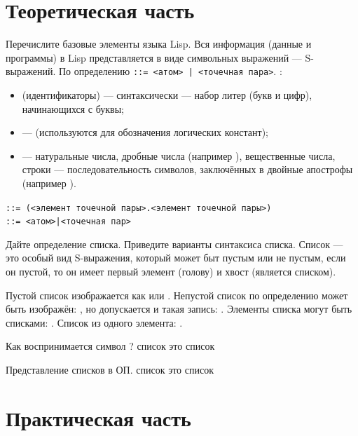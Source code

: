 \documentclass[a4paper]{report}
\begin{document}


\section*{Теоретическая часть}

\begin{qanda}
	\Q Перечислите базовые элементы языка Lisp.
	\A Вся информация (данные и программы) в Lisp представляется в виде символьных выражений — S-выражений.
	По определению  \texttt{::= <атом> | <точечная пара>}. :
	\begin{itemize}
		\item {} (идентификаторы) — синтаксически — набор литер (букв и цифр), начинающихся с буквы;
		\item {} —  (используются для обозначения логических констант);
		\item {} — натуральные числа, дробные числа (например ), вещественные числа, строки — последовательность символов, заключённых в двойные апострофы (например ).
	\end{itemize}

	 \texttt{::= (<элемент точечной пары>.<элемент точечной пары>)}\\
	 \texttt{::= <атом>|<точечная пар>}

	\Q Дайте определение списка. Приведите варианты синтаксиса списка.
	\A Список — это особый вид S-выражения, который может быт пустым или не пустым, если он пустой, то он имеет первый элемент (голову) и хвост (является списком).

	Пустой список изображается как \code{()} или .
	Непустой список по определению может быть изображён: , но допускается и такая запись: .
	Элементы списка могут быть списками: .
	Список из одного элемента: .

	\Q Как воспринимается символ ?
	\A список это список

	\Q Представление списков в ОП.
	\A список это список
\end{qanda}

\section*{Практическая часть}
\end{document}
